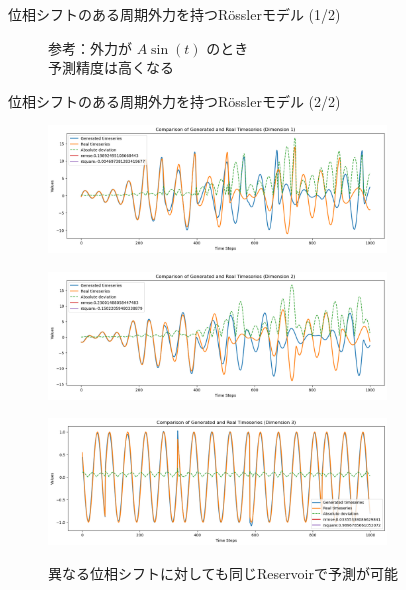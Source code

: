 \begin{frame}{位相シフトのある周期外力を持つRösslerモデル (1/2)}
\begin{minipage}{0.5\textwidth}
\begin{figure}
            \label{rossler_+sin_3.png} %
            \caption{参考：外力が $A \sin (t)$ のとき\\予測精度は高くなる}
        \end{figure}
    \end{minipage}
\end{frame}

\begin{frame}{位相シフトのある周期外力を持つRösslerモデル (2/2)}    
    \begin{minipage}{0.49\textwidth}
        \begin{figure}
            \includegraphics[width=0.8\textwidth]{Fig/custard_1.png}
            \label{custard_1.png} %
        \end{figure}
        \vspace{-1.0cm}

        \begin{figure}
            \includegraphics[width=0.8\textwidth]{Fig/custard_2.png}
            \label{custard_2.png} %
        \end{figure}
        \vspace{-1.0cm}

        \begin{figure}
            \includegraphics[width=0.8\textwidth]{Fig/custard_3.png}
            \label{custard_3.png} %
            \caption{異なる位相シフトに対しても同じReservoirで予測が可能}
        \end{figure}
        \vspace{-1.0cm}
        \end{minipage}


\end{frame}
